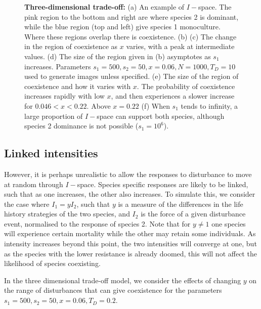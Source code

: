 \begin{figure}[htbp]
\begin{tabular}{rrrr}
\end{tabular}
\caption{\textbf{Three-dimensional trade-off:} (a) An example of $I-$space. The pink region to the bottom and right are where species 2 is dominant, while the blue region (top and left) give species 1 monoculture. Where these regions overlap there is coexistence. (b)  (c) The change in the region of coexistence as $x$ varies, with a peak at intermediate values. (d) The size of the region given in (b) asymptotes as $s_1$ increases. Parameters $s_1=500,s_2=50,x=0.06,N=1000,T_D=10$ used to generate images unless specified. (e) The size of the region of coexistence and how it varies with $x$. The probability of coexistence increases rapidly with low $x$, and then experiences a slower increase for $0.046<x<0.22$. Above $x=0.22$ (f) When $s_1$ tends to infinity, a large proportion of $I-$space can support both species, although species 2 dominance is not possible ($s_1=10^6$).}
\label{full}
\end{figure}

\subsection{Linked intensities}
However, it is perhaps unrealistic to allow the responses to disturbance to move at random through $I-$space. Species specific responses are likely to be linked, such that as one increases, the other also increases. To simulate this, we consider the case where $I_1=yI_2$, such that $y$ is a measure of the differences in the life history strategies of the two species, and $I_2$ is the force of a given disturbance event, normalised to the response of species 2. Note that for $y\neq 1$ one species will experience certain mortality while the other may retain some individuals. As intensity increases beyond this point, the two intensities will converge at one, but as the species with the lower resistance is already doomed, this will not affect the likelihood of species coexisting.

In the three dimensional trade-off model, we consider the effects of changing $y$ on the range of disturbances that can give coexistence for the parameters $s_1=500,s_2=50,x=0.06,T_D=0.2$.

